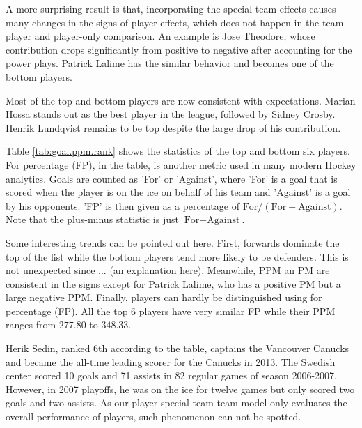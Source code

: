 A more surprising result is that, incorporating the special-team effects causes many changes in the signs of player effects, which does not happen in the team-player and player-only comparison. An example is Jose Theodore, whose contribution drops significantly from positive to negative after accounting for the power plays. Patrick Lalime has the similar behavior and becomes one of the bottom players.

Most of the top and bottom players are now consistent with expectations. Marian Hossa stands out as the best player in the league, followed by Sidney Crosby. Henrik Lundqvist remains to be top despite the large drop of his contribution. 

Table \ref{tab:goal.ppm.rank} shows the statistics of the top and bottom six players. For percentage (FP), in the table, is another metric used in many modern Hockey analytics. Goals are counted as 'For' or 'Against', where 'For' is a goal that is scored when the player is on the ice on behalf of his team and 'Against' is a goal by his opponents. 'FP' is then given as a percentage of $\text{For}/(\text{For}+\text{Against})$. Note that the plus-minus statistic is just $\text{For}-\text{Against}$. 

Some interesting trends can be pointed out here. First, forwards dominate the top of the list while the bottom players tend more likely to be defenders. This is not unexpected since ... (an explanation here). Meanwhile, PPM an PM are consistent in the signs except for Patrick Lalime, who has a positive PM but a large negative PPM. Finally, players can hardly be distinguished using for percentage (FP). All the top 6 players have very similar FP while their PPM ranges from $277.80$ to $348.33$. 

Herik Sedin, ranked 6th according to the table, captains the Vancouver Canucks and became the all-time leading scorer for the Canucks in 2013. The Swedish center scored 10 goals and 71 assists in 82 regular games of season 2006-2007. However, in 2007 playoffs, he was on the ice for twelve games but only scored two goals and two assists. As our player-special team-team model only evaluates the overall performance of players, such phenomenon can not be spotted. 

